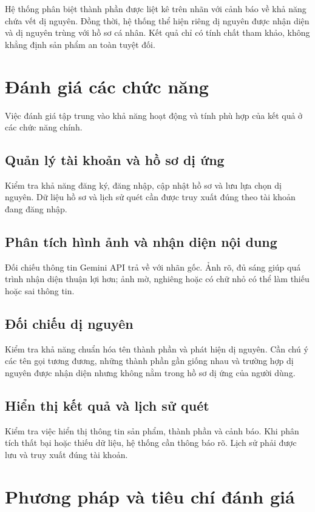 Hệ thống phân biệt thành phần được liệt kê trên nhãn với cảnh báo
về khả năng chứa vết dị nguyên. Đồng thời, hệ thống thể hiện riêng
dị nguyên được nhận diện và dị nguyên trùng với hồ sơ cá nhân.
Kết quả chỉ có tính chất tham khảo, không khẳng định sản phẩm an toàn
tuyệt đối.

\section{Đánh giá các chức năng}

Việc đánh giá tập trung vào khả năng hoạt động và tính phù hợp của
kết quả ở các chức năng chính.

\subsection{Quản lý tài khoản và hồ sơ dị ứng}

Kiểm tra khả năng đăng ký, đăng nhập, cập nhật hồ sơ và lưu lựa chọn
dị nguyên. Dữ liệu hồ sơ và lịch sử quét cần được truy xuất đúng theo
tài khoản đang đăng nhập.

\subsection{Phân tích hình ảnh và nhận diện nội dung}

Đối chiếu thông tin Gemini API trả về với nhãn gốc. Ảnh rõ, đủ sáng
giúp quá trình nhận diện thuận lợi hơn; ảnh mờ, nghiêng hoặc có chữ
nhỏ có thể làm thiếu hoặc sai thông tin.

\subsection{Đối chiếu dị nguyên}

Kiểm tra khả năng chuẩn hóa tên thành phần và phát hiện dị nguyên.
Cần chú ý các tên gọi tương đương, những thành phần gần giống nhau
và trường hợp dị nguyên được nhận diện nhưng không nằm trong hồ sơ
dị ứng của người dùng.

\subsection{Hiển thị kết quả và lịch sử quét}

Kiểm tra việc hiển thị thông tin sản phẩm, thành phần và cảnh báo.
Khi phân tích thất bại hoặc thiếu dữ liệu, hệ thống cần thông báo rõ.
Lịch sử phải được lưu và truy xuất đúng tài khoản.

\section{Phương pháp và tiêu chí đánh giá}

